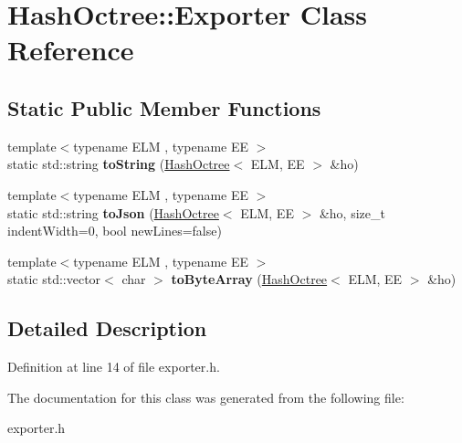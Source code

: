 \hypertarget{class_hash_octree_1_1_exporter}{}\section{Hash\+Octree\+::Exporter Class Reference}
\label{class_hash_octree_1_1_exporter}
\subsection*{Static Public Member Functions}
\begin{DoxyCompactItemize}
\item 
\mbox{\label{class_hash_octree_1_1_exporter_a6134c6782aeaa7481d9b659116db8c12}} 
{\footnotesize template$<$typename E\+LM , typename EE $>$ }\\static std\+::string {\bfseries to\+String} (\mbox{\hyperlink{class_hash_octree_1_1_hash_octree}{Hash\+Octree}}$<$ E\+LM, EE $>$ \&ho)
\item 
\mbox{\label{class_hash_octree_1_1_exporter_aecc8b7ef6eb5729ab2f2ef196e1f276a}} 
{\footnotesize template$<$typename E\+LM , typename EE $>$ }\\static std\+::string {\bfseries to\+Json} (\mbox{\hyperlink{class_hash_octree_1_1_hash_octree}{Hash\+Octree}}$<$ E\+LM, EE $>$ \&ho, size\+\_\+t indent\+Width=0, bool new\+Lines=false)
\item 
\mbox{\label{class_hash_octree_1_1_exporter_a8605fb3351ea5e28725099e783871367}} 
{\footnotesize template$<$typename E\+LM , typename EE $>$ }\\static std\+::vector$<$ char $>$ {\bfseries to\+Byte\+Array} (\mbox{\hyperlink{class_hash_octree_1_1_hash_octree}{Hash\+Octree}}$<$ E\+LM, EE $>$ \&ho)
\end{DoxyCompactItemize}


\subsection{Detailed Description}


Definition at line 14 of file exporter.\+h.



The documentation for this class was generated from the following file\+:\begin{DoxyCompactItemize}
\item 
exporter.\+h\end{DoxyCompactItemize}

